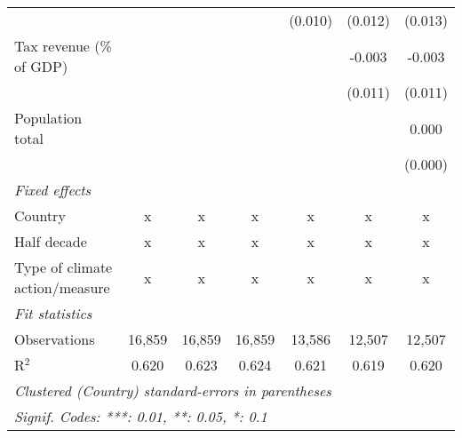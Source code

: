 \begin{tabular}{lcccccc}
                                                             &         &               &               & (0.010)        & (0.012)        & (0.013)\\   
   Tax revenue (\% of GDP)                                   &         &               &               &                & -0.003         & -0.003\\   
                                                             &         &               &               &                & (0.011)        & (0.011)\\   
   Population total                                          &         &               &               &                &                & 0.000\\   
                                                             &         &               &               &                &                & (0.000)\\   
   \emph{Fixed effects}\\
   Country                                                   & x       & x             & x             & x              & x              & x\\  
   Half decade                                               & x       & x             & x             & x              & x              & x\\  
   Type of climate action/measure                            & x       & x             & x             & x              & x              & x\\  
   \midrule \emph{Fit statistics}\\
   Observations                                              & 16,859  & 16,859        & 16,859        & 13,586         & 12,507         & 12,507\\  
   R$^2$                                                     & 0.620   & 0.623         & 0.624         & 0.621          & 0.619          & 0.620\\  
   \midrule
   \multicolumn{7}{l}{\emph{Clustered (Country) standard-errors in parentheses}}\\
   \multicolumn{7}{l}{\emph{Signif. Codes: ***: 0.01, **: 0.05, *: 0.1}}\\
\end{tabular}
\par\endgroup


